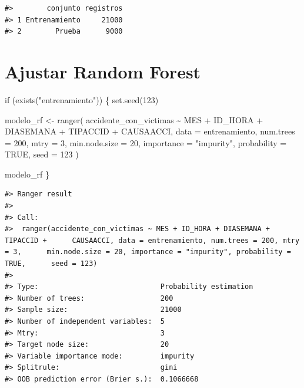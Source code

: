 \documentclass[
  spanish,
  10.5pt,
  letterpaper,
  openany,
  headings=big]{scrbook}
\newenvironment{Shaded}{}{}
\newcommand{\AttributeTok}[1]{\textcolor[rgb]{0.84,0.23,0.29}{#1}}
\newcommand{\ConstantTok}[1]{\textcolor[rgb]{0.00,0.36,0.77}{#1}}
\newcommand{\ControlFlowTok}[1]{\textcolor[rgb]{0.84,0.23,0.29}{#1}}
\newcommand{\DecValTok}[1]{\textcolor[rgb]{0.00,0.36,0.77}{#1}}
\newcommand{\FunctionTok}[1]{\textcolor[rgb]{0.44,0.26,0.76}{#1}}
\newcommand{\NormalTok}[1]{\textcolor[rgb]{0.14,0.16,0.18}{#1}}
\newcommand{\OtherTok}[1]{\textcolor[rgb]{0.44,0.26,0.76}{#1}}
\newcommand{\SpecialCharTok}[1]{\textcolor[rgb]{0.00,0.36,0.77}{#1}}
\newcommand{\StringTok}[1]{\textcolor[rgb]{0.01,0.18,0.38}{#1}}
\begin{document}
\begin{verbatim}
#>        conjunto registros
#> 1 Entrenamiento     21000
#> 2        Prueba      9000
\end{verbatim}

\section{Ajustar Random Forest}\label{ajustar-random-forest}

\begin{Shaded}
\begin{Highlighting}[]
\ControlFlowTok{if}\NormalTok{ (}\FunctionTok{exists}\NormalTok{(}\StringTok{"entrenamiento"}\NormalTok{)) \{}
  \FunctionTok{set.seed}\NormalTok{(}\DecValTok{123}\NormalTok{)}

\NormalTok{  modelo\_rf }\OtherTok{\textless{}{-}} \FunctionTok{ranger}\NormalTok{(}
\NormalTok{    accidente\_con\_victimas }\SpecialCharTok{\textasciitilde{}}\NormalTok{ MES }\SpecialCharTok{+}\NormalTok{ ID\_HORA }\SpecialCharTok{+}\NormalTok{ DIASEMANA }\SpecialCharTok{+}\NormalTok{ TIPACCID }\SpecialCharTok{+}\NormalTok{ CAUSAACCI,}
    \AttributeTok{data =}\NormalTok{ entrenamiento,}
    \AttributeTok{num.trees =} \DecValTok{200}\NormalTok{,}
    \AttributeTok{mtry =} \DecValTok{3}\NormalTok{,}
    \AttributeTok{min.node.size =} \DecValTok{20}\NormalTok{,}
    \AttributeTok{importance =} \StringTok{"impurity"}\NormalTok{,}
    \AttributeTok{probability =} \ConstantTok{TRUE}\NormalTok{,}
    \AttributeTok{seed =} \DecValTok{123}
\NormalTok{  )}

\NormalTok{  modelo\_rf}
\NormalTok{\}}
\end{Highlighting}
\end{Shaded}

\begin{verbatim}
#> Ranger result
#> 
#> Call:
#>  ranger(accidente_con_victimas ~ MES + ID_HORA + DIASEMANA + TIPACCID +      CAUSAACCI, data = entrenamiento, num.trees = 200, mtry = 3,      min.node.size = 20, importance = "impurity", probability = TRUE,      seed = 123) 
#> 
#> Type:                             Probability estimation 
#> Number of trees:                  200 
#> Sample size:                      21000 
#> Number of independent variables:  5 
#> Mtry:                             3 
#> Target node size:                 20 
#> Variable importance mode:         impurity 
#> Splitrule:                        gini 
#> OOB prediction error (Brier s.):  0.1066668
\end{verbatim}
\end{document}

